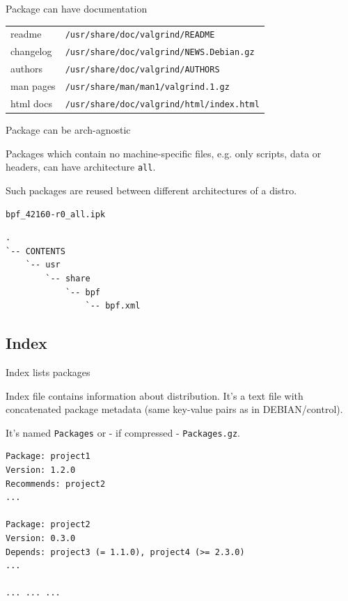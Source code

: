 \documentclass{beamer}
\begin{document}
\begin{frame}[fragile]{Package can have documentation}
    \begin{block}{}
        \renewcommand{\arraystretch}{1.5}
        \begin{tabular}{l l}
            readme & \small\verb|/usr/share/doc/valgrind/README| \\
            changelog & \small\verb|/usr/share/doc/valgrind/NEWS.Debian.gz| \\
            authors & \small\verb|/usr/share/doc/valgrind/AUTHORS| \\
            man pages & \small\verb|/usr/share/man/man1/valgrind.1.gz| \\
            html docs & \small\verb|/usr/share/doc/valgrind/html/index.html| \\
        \end{tabular}
    \end{block}
\end{frame}

\begin{frame}[fragile]{Package can be arch-agnostic}
    \begin{block}{}
        Packages which contain no machine-specific files,
        e.g. only scripts, data or headers, can have architecture \verb|all|.
    \end{block}
    \begin{block}{}
        Such packages are reused
        between different architectures of a distro.
    \end{block}
\begin{lstlisting}[style=Console]
bpf_42160-r0_all.ipk
\end{lstlisting}
\begin{lstlisting}[style=Console]
.
`-- CONTENTS
    `-- usr
        `-- share
            `-- bpf
                `-- bpf.xml
\end{lstlisting}
\end{frame}

\subsection{Index}

\begin{frame}[fragile]{Index lists packages}
    \begin{block}{}
        Index file contains information about distribution.
        It's a text file with concatenated package metadata
        (same key-value pairs as in DEBIAN/control).
    \end{block}
    \begin{block}{}
        It's named \verb|Packages| or - if compressed - \verb|Packages.gz|.
    \end{block}
\begin{lstlisting}[style=Console]
Package: project1
Version: 1.2.0
Recommends: project2
...

Package: project2
Version: 0.3.0
Depends: project3 (= 1.1.0), project4 (>= 2.3.0)
...

... ... ...
\end{lstlisting}
\end{frame}
\end{document}
